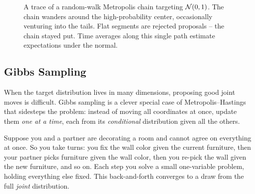 \begin{figure}[H]
\centering
{}
\caption{A trace of a random-walk Metropolis chain targeting $\mathcal{N}(0,1)$. The
chain wanders around the high-probability center, occasionally venturing into the
tails. Flat segments are rejected proposals -- the chain stayed put. Time averages
along this single path estimate expectations under the normal.}
\label{ch35:fig-mh-trace}
\end{figure}

\subsection{Gibbs Sampling}
\label{ch35:gibbs}

When the target distribution lives in many dimensions, proposing good joint moves is difficult.
Gibbs sampling is a clever special case of Metropolis--Hastings that sidesteps
the problem: instead of moving all coordinates at once, update them \emph{one at
a time}, each from its \emph{conditional} distribution given all the others.

\begin{intuitionbox}
Suppose you and a partner are decorating a room and cannot agree on everything at
once. So you take turns: you fix the wall color given the current furniture, then
your partner picks furniture given the wall color, then you re-pick the wall
given the new furniture, and so on. Each step you solve a small one-variable
problem, holding everything else fixed. This back-and-forth converges
to a draw from the full \emph{joint} distribution.
\end{intuitionbox}

